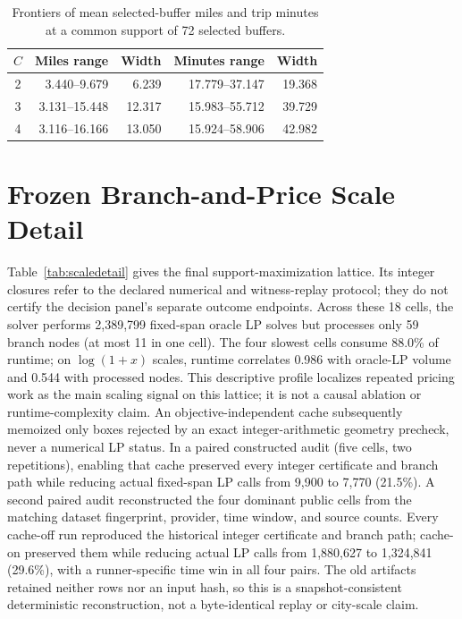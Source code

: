 \begin{table}[t]
\caption{Frontiers of mean selected-buffer miles and trip minutes at a common
support of 72 selected buffers.}
\label{tab:capacitydetail}
\centering
\begin{tabular}{@{}crrrr@{}}
\toprule
$C$ & Miles range & Width & Minutes range & Width \\
\midrule
2 & 3.440--9.679 & 6.239 & 17.779--37.147 & 19.368 \\
3 & 3.131--15.448 & 12.317 & 15.983--55.712 & 39.729 \\
4 & 3.116--16.166 & 13.050 & 15.924--58.906 & 42.982 \\
\bottomrule
\end{tabular}
\end{table}

\section{Frozen Branch-and-Price Scale Detail}
Table~\ref{tab:scaledetail} gives the final support-maximization lattice.
Its integer closures refer to the declared numerical and witness-replay
protocol; they do not certify the decision panel's separate outcome endpoints.
Across these 18 cells, the solver performs 2,389,799 fixed-span oracle LP
solves but processes only 59 branch nodes (at most 11 in one cell).  The four
slowest cells consume 88.0\% of runtime; on $\log(1+x)$ scales, runtime
correlates 0.986 with oracle-LP volume and 0.544 with processed nodes.  This
descriptive profile localizes repeated pricing work as the main scaling signal
on this lattice; it is not a causal ablation or runtime-complexity claim.
An objective-independent cache subsequently memoized only boxes rejected by
an exact integer-arithmetic geometry precheck, never a numerical LP status.
In a paired constructed audit (five cells, two repetitions), enabling that
cache preserved every integer certificate and branch path while reducing
actual fixed-span LP calls from 9,900 to 7,770 (21.5\%).  A second paired audit
reconstructed the four dominant public cells from the matching dataset
fingerprint, provider, time window, and source counts.  Every cache-off run
reproduced the historical integer certificate and branch path; cache-on
preserved them while reducing actual LP calls from 1,880,627 to 1,324,841
(29.6\%), with a runner-specific time win in all four pairs.  The old artifacts
retained neither rows nor an input hash, so this is a snapshot-consistent
deterministic reconstruction, not a byte-identical replay or city-scale claim.
